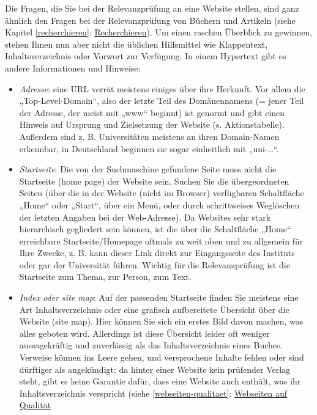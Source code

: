 \documentclass[]{book}
\providecommand{\tightlist}{%
  \setlength{\itemsep}{0pt}\setlength{\parskip}{0pt}}
\theoremstyle{definition}
\theoremstyle{definition}
\theoremstyle{definition}
\theoremstyle{remark}
\begin{document}
Die Fragen, die Sie bei der Relevanzprüfung an eine Website stellen,
sind ganz ähnlich den Fragen bei der Relevanzprüfung von Büchern und
Artikeln (siehe Kapitel \ref{recherchieren}:
\protect\hyperlink{recherchieren}{Recherchieren}). Um einen raschen
Überblick zu gewinnen, stehen Ihnen nun aber nicht die üblichen
Hilfsmittel wie Klappentext, Inhaltsverzeichnis oder Vorwort zur
Verfügung. In einem Hypertext gibt es andere Informationen und Hinweise:

\begin{itemize}
\tightlist
\item
  \emph{Adresse}: eine URL verrät meistens einiges über ihre Herkunft.
  Vor allem die „Top-Level-Domain``, also der letzte Teil des
  Domänennamens (= jener Teil der Adresse, der meist mit „www`` beginnt)
  ist genormt und gibt einen Hinweis auf Ursprung und Zielsetzung der
  Website (s. Aktionstabelle). Außerdem sind z. B. Universitäten
  meistens an ihren Domain-Namen erkennbar, in Deutschland beginnen sie
  sogar einheitlich mit „uni-\ldots{}``.
\item
  \emph{Startseite}: Die von der Suchmaschine gefundene Seite muss nicht
  die Startseite (home page) der Website sein. Suchen Sie die
  übergeordneten Seiten (über die in der Website (nicht im Browser)
  verfügbaren Schaltfläche „Home`` oder „Start``, über ein Menü, oder
  durch schrittweises Weglöschen der letzten Angaben bei der
  Web-Adresse). Da Websites sehr stark hierarchisch gegliedert sein
  können, ist die über die Schaltfläche „Home`` erreichbare
  Startseite/Homepage oftmals zu weit oben und zu allgemein für Ihre
  Zwecke, z. B. kann dieser Link direkt zur Eingangsseite des Instituts
  oder gar der Universität führen. Wichtig für die Relevanzprüfung ist
  die Startseite zum Thema, zur Person, zum Text.
\item
  \emph{Index oder site map}: Auf der passenden Startseite finden Sie
  meistens eine Art Inhaltsverzeichnis oder eine grafisch aufbereitete
  Übersicht über die Website (site map). Hier können Sie sich ein erstes
  Bild davon machen, was alles geboten wird. Allerdings ist diese
  Übersicht leider oft weniger aussagekräftig und zuverlässig als das
  Inhaltsverzeichnis eines Buches. Verweise können ins Leere gehen, und
  versprochene Inhalte fehlen oder sind dürftiger als angekündigt: da
  hinter einer Website kein prüfender Verlag steht, gibt es keine
  Garantie dafür, dass eine Website auch enthält, was ihr
  Inhaltsverzeichnis verspricht (siehe \ref{webseiten-qualitaet}:
  \protect\hyperlink{webseiten-qualitaet}{Webseiten auf Qualität
}
\end{itemize}
\end{document}
